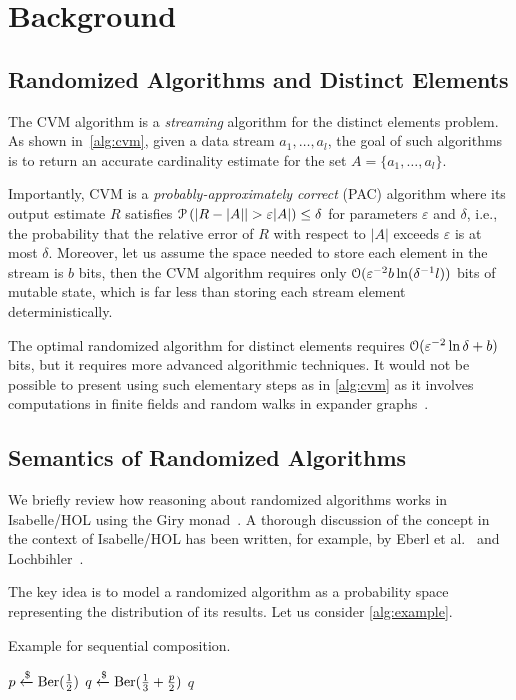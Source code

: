 \section{Background}
\label{sec:background}

\subsection{Randomized Algorithms and Distinct Elements}

The CVM algorithm is a \emph{streaming} algorithm for the distinct elements problem.
As shown in~\cref{alg:cvm}, given a data stream $a_1,\dots, a_l$, the goal of such algorithms is to return an accurate cardinality estimate for the set $A = \{a_1,\dots,a_l\}$.

Importantly, CVM is a \emph{probably-approximately correct} (PAC) algorithm where its output estimate $R$ satisfies
$\operatorname{\mathcal P} \left( |R - |A| | > \varepsilon |A| \right) \leq \delta$
for parameters $\varepsilon$ and $\delta$,
i.e., the probability that the relative error of $R$ with respect to $|A|$ exceeds $\varepsilon$ is at most $\delta$. %
Moreover, let us assume the space needed to store each element in the stream is $b$ bits, then the CVM algorithm requires only $\operatorname{\mathcal O}(\varepsilon^{-2} b \ln(\delta^{-1} l))$ bits of mutable state, which is far less than storing each stream element deterministically.

\begin{remark}
The optimal randomized algorithm for distinct elements requires $\operatorname{\mathcal O}( \varepsilon^{-2} \ln \delta + b)$ bits, but it requires more advanced algorithmic techniques. It would not be possible to present using such elementary steps as in \cref{alg:cvm} as it involves computations in finite fields and random walks in expander graphs~\cite{blasiok2020, karayel2023}.
\lipicsEnd\end{remark}

\subsection{Semantics of Randomized Algorithms}
We briefly review how reasoning about randomized algorithms works in Isabelle/HOL using the Giry monad~\cite{giry1982}.
A thorough discussion of the concept in the context of Isabelle/HOL has been written, for example, by Eberl et al.~\cite{eberl2020} and Lochbihler~\cite{lochbihler2016}.

The key idea is to model a randomized algorithm as a probability space representing the distribution of its results.
Let us consider \cref{alg:example}.
\begin{algorithm}[h!]
\caption{Example for sequential composition.}\label{alg:example}
\begin{algorithmic}[1]
\State $p \xleftarrow{\$} \operatorname{\mathrm{Ber}}(\frac{1}{2})$
\State $q \xleftarrow{\$} \operatorname{\mathrm{Ber}}(\frac{1}{3}+\frac{p}{2})$
\State \Return $q$
\end{algorithmic}
\end{algorithm}%

